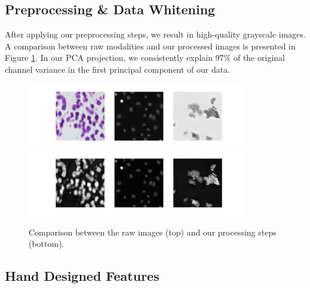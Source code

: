 \documentclass[paper=letter, fontsize=12pt]{article}
\numberwithin{equation}{section} %
\numberwithin{figure}{section} %
\numberwithin{table}{section} %
\begin{document}
\subsection{Preprocessing \& Data Whitening}

After applying our preprocessing steps, we result in high-quality grayscale
images.  A comparison between raw modalities and our processed images is
presented in Figure \ref{fig:processing-results}.  In our PCA projection,
we consistently explain 97\% of the original channel variance in the first
principal component of our data.

\begin{figure}[H]
    \centering
    \includegraphics[width=0.85\textwidth]{./figs/raw-modalities.png}
    \includegraphics[width=0.85\textwidth]{./figs/processed-modalities.png}
    \caption{Comparison between the raw images (top) and our processing steps
    (bottom).}
    \label{fig:processing-results}
\end{figure}

\subsection{Hand Designed Features}
\end{document}

